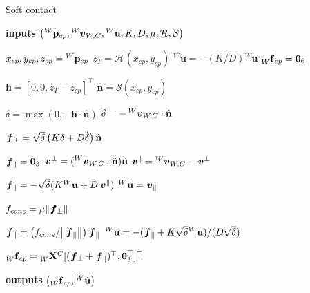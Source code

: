 \begin{algorithm}
\caption{Soft contact}
\label{algo:soft_contacts}
\begin{algorithmic}[1]
\small

\State \textbf{inputs} $\left( \pos[W]_{cp}, \vellin[W]_{W,C}, {}^W \mathbf{u}, K, D, \mu, \mathcal{H}, \mathcal{S} \right)$

\State $x_{cp}, y_{cp}, z_{cp} = \pos[W]_{cp}$
\State $z_T = \mathcal{H}(x_{cp}, y_{cp})$
\State ${}^W \dot{\mathbf{u}} = -(K / D) {}^W \mathbf{u}$
\State $\forcesix[W]_{cp} = \zeros_6$

    \State $\mathbf{h} = \left[0, 0, z_T - z_{cp}\right]^\top$
    \State $\hat{\mathbf{n}} = \mathcal{S}(x_{cp}, y_{cp})$

    \State $\delta = \max(0, -\mathbf{h} \cdot \hat{\mathbf{n}})$
    \State $\dot{\delta} = -\vellin[W]_{W,C} \cdot \hat{\mathbf{n}}$
    
    \State $\forcelin_\perp = \sqrt{\delta} \left( K \delta + D \dot{\delta} \right) \hat{\mathbf{n}}$
    
    \State $\forcelin_\parallel = \zeros_3$
        \State $\vellin^\perp = (\vellin[W]_{W,C} \cdot \hat{\mathbf{n}}) \hat{\mathbf{n}}$
        \State $\vellin^\parallel = \vellin[W]_{W,C} - \vellin^\perp$

        \State $\forcelin_\parallel = -\sqrt{\delta}(K {}^W \mathbf{u} + D  \vellin^\parallel)$
        \State ${}^W \dot{\mathbf{u}} = \vellin_\parallel$
    
        \State $f_{cone} = \mu \norm{\forcelin_\perp}$
        
            \State $\forcelin_\parallel = \left(f_{cone} / \norm{\forcelin_\parallel}\right) \forcelin_\parallel$
            \State ${}^W \dot{\mathbf{u}} = -(\forcelin_\parallel + K \sqrt{\delta} {}^W \mathbf{u}) / (D \sqrt{\delta})$
        \EndIf
    \EndIf
    
    \State $\forcesix[W]_{cp} = \transfor[W]^C [(\forcelin_\perp + \forcelin_\parallel)^\top, \zeros^\top_3]^\top$
\EndIf

\State \textbf{outputs} $\left(\forcesix[W]_{cp}, {}^W \dot{\mathbf{u}}\right)$

\end{algorithmic}
\end{algorithm}

